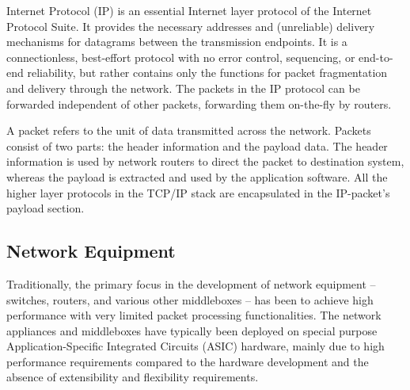 Internet Protocol (IP) is an essential Internet layer protocol of the Internet Protocol Suite. It provides the necessary addresses and (unreliable) delivery mechanisms for datagrams between the transmission endpoints. It is a connectionless, best-effort protocol with no error control, sequencing, or end-to-end reliability, but rather contains only the functions for packet fragmentation and delivery through the network. The packets in the IP protocol can be forwarded independent of other packets, forwarding them on-the-fly by routers.

A packet refers to the unit of data transmitted across the network. Packets consist of two parts: the header information and the payload data. The header information is used by network routers to direct the packet to destination system, whereas the payload is extracted and used by the application software. All the higher layer protocols in the TCP/IP stack are encapsulated in the IP-packet's payload section.

\subsection{Network Equipment}



Traditionally, the primary focus in the development of network equipment -- switches, routers, and various other middleboxes -- has been to achieve high performance with very limited packet processing functionalities. The network appliances and middleboxes have typically been deployed on special purpose Application-Specific Integrated Circuits (ASIC) hardware, mainly due to high performance requirements compared to the hardware development and the absence of extensibility and flexibility requirements.~\cite{Dobrescu:2009:REP}

